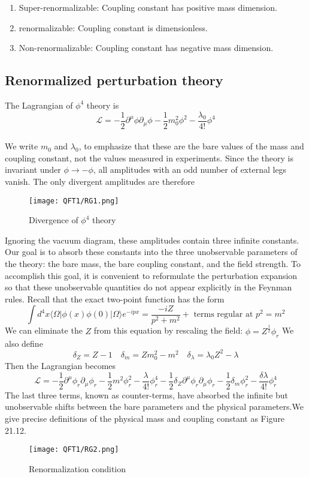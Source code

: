 \begin{enumerate}
\item Super-renormalizable: Coupling constant has positive mass dimension.
\item  renormalizable: Coupling constant is dimensionless.
\item  Non-renormalizable: Coupling constant has negative mass dimension.
\end{enumerate}

\subsection{Renormalized perturbation theory}
The Lagrangian of $\phi^4$ theory is 
\[\mathcal{L} = -\frac{1}{2} \partial^{\mu} \phi \partial_{\mu} \phi -\frac{1}{2}m_0^2 \phi^2 - \frac{\lambda_0}{4!}\phi^4\]
\\
We write $m_0$ and $\lambda_0$, to emphasize that these are the bare values of the mass and coupling constant, not the values measured in experiments.
Since the theory is invariant under $\phi \to -\phi$, all amplitudes with an odd number of external legs vanish. The only divergent amplitudes are therefore
\begin{figure}[!h]
\centering
\texttt{[image: QFT1/RG1.png]}
\caption{Divergence of $\phi^4$ theory}
\end{figure}
\noindent
Ignoring the vacuum diagram, these amplitudes contain three infinite constants. Our goal is to absorb these constants into the three unobservable parameters of the theory: the bare mass, the bare coupling constant, and the field strength. To accomplish this goal, it is convenient to reformulate the perturbation expansion so that these unobservable quantities do not appear
explicitly in the Feynman rules. Recall that the exact two-point function has the form
\[\int d^4x \langle \Omega | \phi(x) \phi(0) | \Omega \rangle e^{-ipx} = \frac{-iZ}{p^2+m^2} + \mbox{ terms regular at } p^2 = m^2\]
We can eliminate the $Z$ from this equation by rescaling the field:
$\phi = Z^{\frac{1}{2}} \phi_r$
We also define
\[\delta_Z = Z -1 \quad \delta_m = Zm_0^2 - m^2 \quad \delta_{\lambda} = \lambda_0 Z^2 - \lambda\]
Then the Lagrangian becomes
\[\mathcal{L} = -\frac{1}{2} \partial^{\mu} \phi_r \partial_{\mu} \phi_r -\frac{1}{2}m^2 \phi_r^2 - \frac{\lambda}{4!}\phi_r^4 -\frac{1}{2} \delta_Z \partial^{\mu} \phi_r \partial_{\mu} \phi_r -\frac{1}{2}\delta_m \phi_r^2 - \frac{\delta \lambda}{4!}\phi_r^4\]
The last three terms, known as counter-terms, have absorbed the infinite but unobservable shifts between the bare parameters and the physical parameters.We give precise definitions of the physical mass and coupling constant as Figure 21.12.\\
\begin{figure}[!h]
\centering
\texttt{[image: QFT1/RG2.png]}
\caption{Renormalization condition}
\end{figure}

